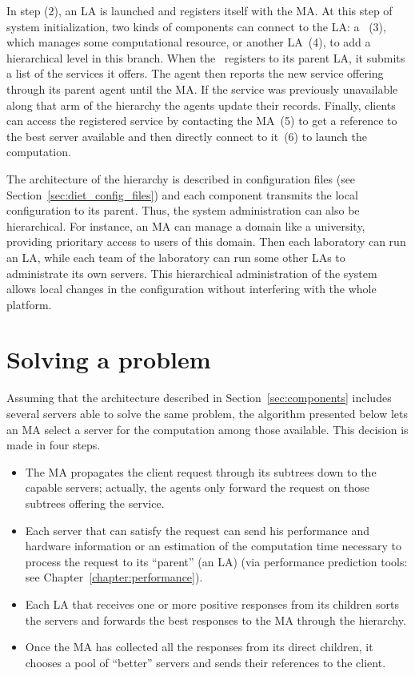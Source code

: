 In step (2), an LA is launched and registers itself with the MA.  At this step
of system initialization, two kinds of components can connect to the LA: a \sed
~(3), which manages some computational resource, or another LA~(4), to add a
hierarchical level in this branch. When the \sed\ registers to its parent LA,
it submits a list of the services it offers.  The agent then reports the new
service offering through its parent agent until the MA.  If the service was
previously unavailable along that arm of the hierarchy the agents update their
records.  Finally, clients can access the registered service by contacting the
MA~(5) to get a reference to the best server available and then directly
connect to it~(6) to launch the computation.

The architecture of the hierarchy is described in configuration files (see
Section~\ref{sec:diet_config_files}) and each component transmits the local
configuration to its parent. Thus, the system administration can also be
hierarchical. For instance, an MA can manage a domain like a university,
providing prioritary access to users of this domain. Then each laboratory can
run an LA, while each team of the laboratory can run some other LAs to
administrate its own servers. This hierarchical administration of the system
allows local changes in the configuration without interfering with the whole
platform.



\section{Solving a problem}
\label{sec:solvepb}

Assuming that the architecture described in Section~\ref{sec:components}
includes several servers able to solve the same problem, the algorithm
presented below lets an MA select a server for the computation among those
available. This decision is made in four steps.

\begin{itemize}
\item The MA propagates the client request through its subtrees down to the
  capable servers; actually, the agents only forward the request on those
  subtrees offering the service.
\item Each server that can satisfy the request can send his performance and
  hardware information or  an estimation of  the computation time necessary to
  process the request to its ``parent'' (an LA) (via performance prediction
  tools: see Chapter~\ref{chapter:performance}). 
\item Each LA that receives one or more positive responses from its children
  sorts the servers and forwards the best responses to the MA through the
  hierarchy.
\item Once the MA has collected all the responses from its direct children, it
  chooses a pool of ``better'' servers and sends their references to the client.
\end{itemize}


